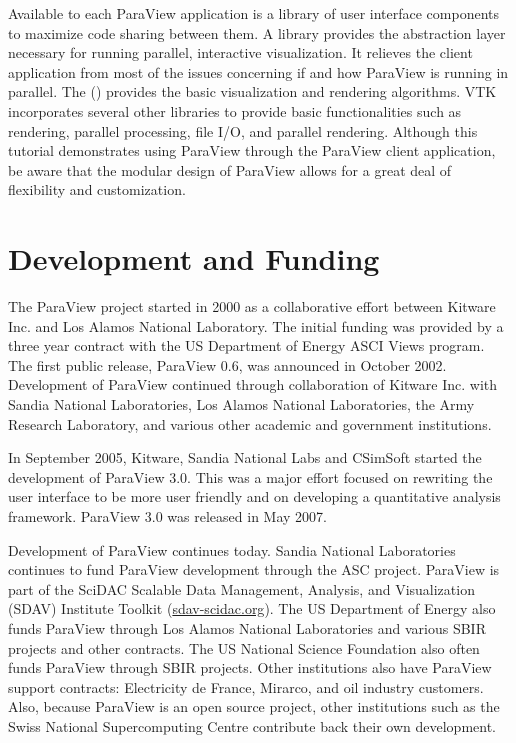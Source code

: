 Available to each ParaView application is a library of user interface
components to maximize code sharing between them.  A  library provides the abstraction layer necessary for running
parallel, interactive visualization.  It relieves the client application
from most of the issues concerning if and how ParaView is running in
parallel.  The  () provides the
basic visualization and rendering algorithms.  VTK incorporates several
other libraries to provide basic functionalities such as rendering,
parallel processing, file I/O, and parallel rendering.  Although this
tutorial demonstrates using ParaView through the ParaView client
application, be aware that the modular design of ParaView allows for a
great deal of flexibility and customization.

\section{Development and Funding}

The ParaView project started in 2000 as a collaborative effort between
Kitware Inc. and Los Alamos National Laboratory. The initial funding was
provided by a three year contract with the US Department of Energy ASCI
Views program.  The first public release, ParaView 0.6, was announced in
October 2002.  Development of ParaView continued through collaboration of
Kitware Inc. with Sandia National Laboratories, Los Alamos National
Laboratories, the Army Research Laboratory, and various other academic and
government institutions.

In September 2005, Kitware, Sandia National Labs and CSimSoft started the
development of ParaView 3.0. This was a major effort focused on rewriting
the user interface to be more user friendly and on developing a
quantitative analysis framework. ParaView 3.0 was released in May 2007.

Development of ParaView continues today.  Sandia National Laboratories
continues to fund ParaView development through the ASC project.  ParaView
is part of the SciDAC Scalable Data Management, Analysis, and Visualization
(SDAV) Institute Toolkit (\href{http://sdav-scidac.org}{sdav-scidac.org}).
The US Department of Energy also funds ParaView through Los Alamos National
Laboratories and various SBIR projects and other contracts.  The US
National Science Foundation also often funds ParaView through SBIR
projects.  Other institutions also have ParaView support contracts:
Electricity de France, Mirarco, and oil industry customers.  Also, because
ParaView is an open source project, other institutions such as the Swiss
National Supercomputing Centre contribute back their own development.


